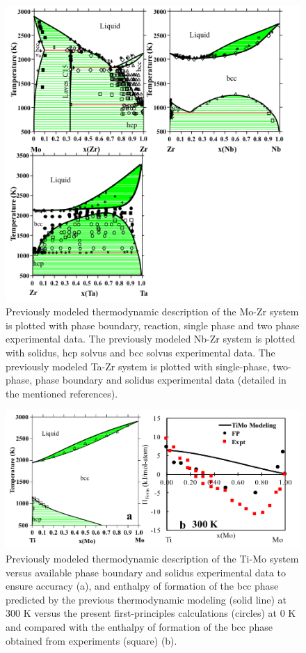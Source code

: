 \newpage
\begin{figure}[H]
	\centering
	\includegraphics[width=\textwidth]{Chapter-3/Figures/binary2.png}
	\caption{Previously modeled thermodynamic description of the Mo-Zr \cite{Perez2003} system is plotted with phase boundary, reaction, single phase and two phase experimental data. The previously modeled Nb-Zr \cite{Guillermet1991,Abriata1982} system is plotted with solidus, hcp solvus and bcc solvus experimental data. The previously modeled Ta-Zr \cite{Guillermet1995} system is plotted with single-phase, two-phase, phase boundary and solidus experimental data (detailed in the mentioned references).}
	\label{Ch3-figure:binary2}
\end{figure}

\newpage
\begin{figure}[H]
	\centering
	\includegraphics[width=\textwidth]{Chapter-3/Figures/TiMo.png}
	\caption{Previously modeled thermodynamic description of the Ti-Mo system versus available phase boundary and solidus experimental data to ensure accuracy \cite{Ansara1998,Murray1981} (a), and enthalpy of formation of the bcc phase predicted by the previous thermodynamic modeling (solid line) at 300 K versus the present first-principles calculations (circles) at 0 K and compared with the enthalpy of formation of the bcc phase obtained from experiments (square) \cite{Uesugi2013} (b).}
	\label{Ch3-figure:TiMo}
\end{figure}

